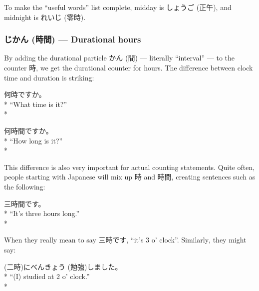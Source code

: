 \documentclass[11pt, b5paper, twoside, openright, onecolumn]{book}
\makeatletter
\newcommand*{\rubystack}[2]{{\relscale{0.5}%
  \begin{tabular}[b]{@{}c@{}}%
    {#1}\\%
   {\textscale{2}{#2}}%
  \end{tabular}}%
}
\DeclareRobustCommand*{\ruby}[2]{%
  \mbox{%
    \setlength{\parskip}{0ex}%
    \BeginAccSupp{method=pdfstringdef,ActualText={#1}}%
      \rubystack{\phantom{#2}}{#1}%
      \llap{%
        \rubystack{#2}{\phantom{#1}}%
      }%
    \EndAccSupp{}%
  }%
}
\renewcommand*{\ruby}[2]{#2 (#1)}%
\newenvironment{exampleblock}{
\setlength{\parindent}{0.6in}
\begin{minipage}[t]{\dimexpr\textwidth-\parindent}}
{\end{minipage}}
\makeatother
\begin{document}
To make the “useful words” list complete‚ midday is \ruby{正午}{しょうご}‚ and midnight is \ruby{零時}{れいじ}.

\subsubsection{\ruby{時間}{じかん} — Durational hours}

By adding the durational particle \ruby{間}{かん} — literally “interval” — to the counter 時‚ we get the durational counter for hours. The difference between clock time and duration is striking:

\vspace{0.4cm}
\begin{exampleblock}
何時ですか。 \\* 
“What time is it?” \\* 
\end{exampleblock}
\vspace{0.2cm}

\begin{exampleblock}
何時間ですか。 \\* 
“How long is it?” \\* 
\end{exampleblock}
\vspace{0.2cm}

This difference is also very important for actual counting statements. Quite often‚ people starting with Japanese will mix up 時 and 時間‚ creating sentences such as the following:

\vspace{0.4cm}
\begin{exampleblock}
三時間です。 \\* 
“It’s three hours long.” \\* 
\end{exampleblock}
\vspace{0.2cm}

When they really mean to say 三時です‚ “it’s 3 o’ clock”. Similarly‚ they might say:

\vspace{0.4cm}
\begin{exampleblock}
\ruby{二時}{}に\ruby{勉強}{べんきょう}しました。 \\* 
“(I) studied at 2 o’ clock.” \\* 
\end{exampleblock}
\vspace{0.2cm}
\end{document}
